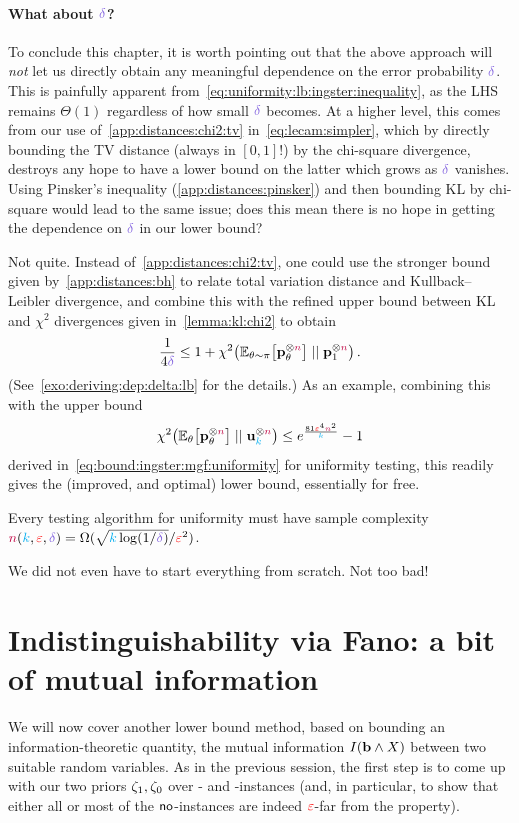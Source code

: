 \paragraph{What about $\errprob$?} To conclude this chapter, it is worth pointing out that the above approach will \emph{not} let us directly obtain any meaningful dependence on the error probability $\errprob$. This is painfully apparent from~\cref{eq:uniformity:lb:ingster:inequality}, as the LHS remains $\Theta(1)$ regardless of how small $\errprob$ becomes. At a higher level, this comes from our use of~\cref{app:distances:chi2:tv} in~\cref{eq:lecam:simpler}, which by directly bounding the TV distance (always in $[0,1]$!) by the chi-square divergence, destroys any hope to have a lower bound on the latter which grows as $\errprob$ vanishes. Using Pinsker's inequality (\cref{app:distances:pinsker}) and then bounding KL by chi-square would lead to the same issue; does this mean there is no hope in getting the dependence on $\errprob$ in our lower bound?

Not quite. Instead of~\cref{app:distances:chi2:tv}, one could use the stronger bound given by~\cref{app:distances:bh} to relate total variation distance and Kullback--Leibler divergence, and combine this with the refined upper bound between KL and $\chi^2$ divergences given in~\cref{lemma:kl:chi2} to obtain
\begin{equation}
	\label{eq:lecam:simpler:but:with:delta}
	\frac{1}{4\errprob}
	\leq 1+\chisquare{\bE{\theta\sim\pi}{\p_\theta^{\otimes\ns}}}{\p_\accept^{\otimes\ns}}\,.
\end{equation}
(See~\cref{exo:deriving:dep:delta:lb} for the details.) As an example, combining this with the upper bound 
\[
\chisquare{\bE{\theta}{\p_\theta^{\otimes\ns}}}{\uniform_\ab^{\otimes\ns}}
\leq e^{\frac{81\dst^4\ns^2}{\ab}} - 1
\]
derived in~\cref{eq:bound:ingster:mgf:uniformity} for uniformity testing, this readily gives the (improved, and optimal) lower bound, essentially for free.
\begin{theorem}
  \label{theo:uniformity:lb:ingster:with:delta}
Every testing algorithm for uniformity must have sample complexity $\ns(\ab,\dst,\errprob) = \Omega(\sqrt{\ab\log(1/\errprob)}/\dst^2)$.
\end{theorem}
\noindent We did not even have to start everything from scratch. Not too bad!
\section{Indistinguishability via Fano: a bit of mutual information}
	\label{ssec:dk16}
We will now cover another lower bound method, based on bounding an information-theoretic quantity, the mutual information $\mutualinfo{\mathbf{b}}{X}$ between two suitable random variables. As in the previous session, the first step is to come up with our two priors $\zeta_1,\zeta_0$ over \yes- and \no-instances (and, in particular, to show that either all or most of the ${\sf{}no}$-instances are indeed $\textcolor{red}{\varepsilon}$-far from the property).

